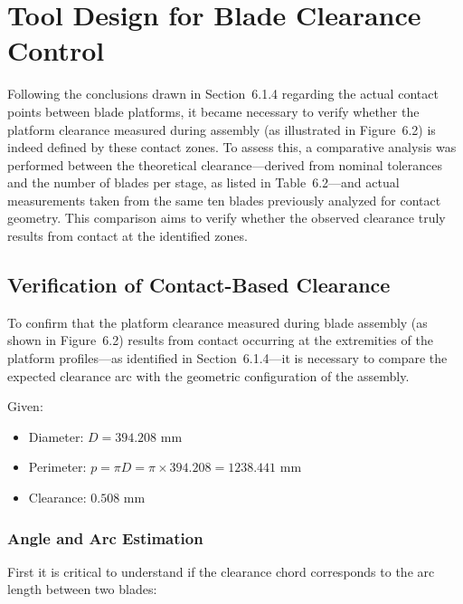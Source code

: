 
%

\chapter{Tool Design for Blade Clearance Control}
\label{cha:toolclear}


Following the conclusions drawn in Section~6.1.4 regarding the actual contact points between blade platforms, it became necessary to verify whether the platform clearance measured during assembly (as illustrated in Figure~6.2) is indeed defined by these contact zones. To assess this, a comparative analysis was performed between the theoretical clearance—derived from nominal tolerances and the number of blades per stage, as listed in Table~6.2—and actual measurements taken from the same ten blades previously analyzed for contact geometry. This comparison aims to verify whether the observed clearance truly results from contact at the identified zones.


\section*{Verification of Contact-Based Clearance}

To confirm that the platform clearance measured during blade assembly (as shown in Figure~6.2) results from contact occurring at the extremities of the platform profiles—as identified in Section~6.1.4—it is necessary to compare the expected clearance arc with the geometric configuration of the assembly.

Given:
\begin{itemize}
    \item Diameter: $D = 394.208$ mm
    \item Perimeter: $p = \pi D = \pi \times 394.208 = 1238.441$ mm
    \item Clearance: $0.508$ mm
\end{itemize}

\subsection*{Angle and Arc Estimation}

First it is critical to understand if the clearance chord corresponds to the arc length between two blades:


